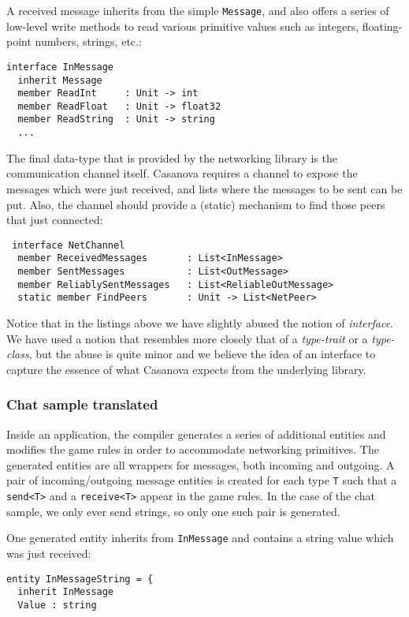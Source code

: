 A received message inherits from the simple \texttt{Message}, and also offers a series of low-level write methods to read various primitive values such as integers, floating-point numbers, strings, etc.:

\begin{lstlisting}
interface InMessage
  inherit Message
  member ReadInt     : Unit -> int
  member ReadFloat   : Unit -> float32
  member ReadString  : Unit -> string
  ...
\end{lstlisting}

The final data-type that is provided by the networking library is the communication channel itself. Casanova requires a channel to expose the messages which were just received, and lists where the messages to be sent can be put. Also, the channel should provide a (static) mechanism to find those peers that just connected:

\begin{lstlisting}
 interface NetChannel
  member ReceivedMessages       : List<InMessage>
  member SentMessages           : List<OutMessage>
  member ReliablySentMessages   : List<ReliableOutMessage>
  static member FindPeers       : Unit -> List<NetPeer>
\end{lstlisting}

Notice that in the listings above we have slightly abused the notion of \textit{interface}. We have used a notion that resembles more closely that of a \textit{type-trait} or a \textit{type-class}, but the abuse is quite minor and we believe the idea of an interface to capture the essence of what Casanova expects from the underlying library.

\subsubsection{Chat sample translated}
Inside an application, the compiler generates a series of additional entities and modifies the game rules in order to accommodate networking primitives. The generated entities are all wrappers for messages, both incoming and outgoing. A pair of incoming/outgoing message entities is created for each type \texttt{T} such that a \texttt{send<T>} and a \texttt{receive<T>} appear in the game rules. In the case of the chat sample, we only ever send strings, so only one such pair is generated.

One generated entity inherits from \texttt{InMessage} and contains a string value which was just received:

\begin{lstlisting}
entity InMessageString = {
  inherit InMessage
  Value : string
\end{lstlisting}

